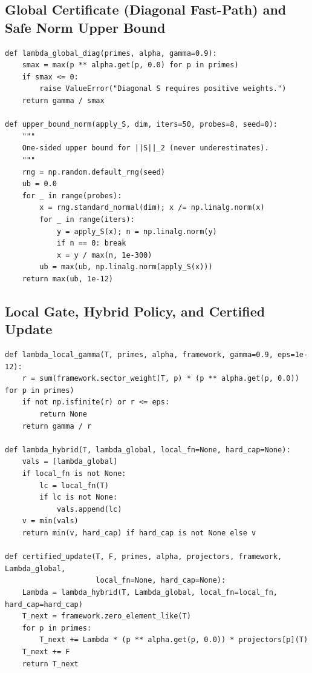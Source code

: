 \documentclass[11pt]{article}
\theoremstyle{definition}
\begin{document}
\subsection{Global Certificate (Diagonal Fast-Path) and Safe Norm Upper Bound}
\begin{lstlisting}[style=py,caption={Diagonal $\|S\|$ and one-sided upper bound for general $S$},label={lst:norms}]
def lambda_global_diag(primes, alpha, gamma=0.9):
    smax = max(p ** alpha.get(p, 0.0) for p in primes)
    if smax <= 0:
        raise ValueError("Diagonal S requires positive weights.")
    return gamma / smax

def upper_bound_norm(apply_S, dim, iters=50, probes=8, seed=0):
    """
    One-sided upper bound for ||S||_2 (never underestimates).
    """
    rng = np.random.default_rng(seed)
    ub = 0.0
    for _ in range(probes):
        x = rng.standard_normal(dim); x /= np.linalg.norm(x)
        for _ in range(iters):
            y = apply_S(x); n = np.linalg.norm(y)
            if n == 0: break
            x = y / max(n, 1e-300)
        ub = max(ub, np.linalg.norm(apply_S(x)))
    return max(ub, 1e-12)
\end{lstlisting}

\subsection{Local Gate, Hybrid Policy, and Certified Update}
\begin{lstlisting}[style=py,caption={Local Rayleigh gate, hybrid selection, and certified update},label={lst:hybrid}]
def lambda_local_gamma(T, primes, alpha, framework, gamma=0.9, eps=1e-12):
    r = sum(framework.sector_weight(T, p) * (p ** alpha.get(p, 0.0)) for p in primes)
    if not np.isfinite(r) or r <= eps:
        return None
    return gamma / r

def lambda_hybrid(T, lambda_global, local_fn=None, hard_cap=None):
    vals = [lambda_global]
    if local_fn is not None:
        lc = local_fn(T)
        if lc is not None:
            vals.append(lc)
    v = min(vals)
    return min(v, hard_cap) if hard_cap is not None else v

def certified_update(T, F, primes, alpha, projectors, framework, Lambda_global,
                     local_fn=None, hard_cap=None):
    Lambda = lambda_hybrid(T, Lambda_global, local_fn=local_fn, hard_cap=hard_cap)
    T_next = framework.zero_element_like(T)
    for p in primes:
        T_next += Lambda * (p ** alpha.get(p, 0.0)) * projectors[p](T)
    T_next += F
    return T_next
\end{lstlisting}
\end{document}
